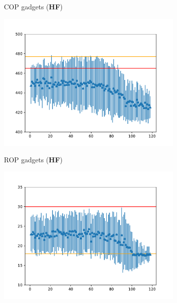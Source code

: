 \begin{figure}
\begin{subfigure}[b]{0.4\textwidth}
         \caption{COP gadgets (\textbf{HF})}
       \end{subfigure}
       \begin{subfigure}[b]{0.4\textwidth}
         \centering
         \includegraphics[width=\textwidth]{doccam_figures/tree_hf_lr_0001/ROP_gadgets_75_119_sparsed.pdf}
         \label{fig:rop}
         \vspace{-0.2in}
         \caption{ROP gadgets (\textbf{HF})}
     \end{subfigure}
     \begin{subfigure}[b]{0.4\textwidth}
         \centering
         \includegraphics[width=\textwidth]{doccam_figures/tree_hf_lr_0001/JOP_gadgets_75_119_sparsed.pdf}
         \label{fig:jop}

\end{subfigure}
\end{figure}
